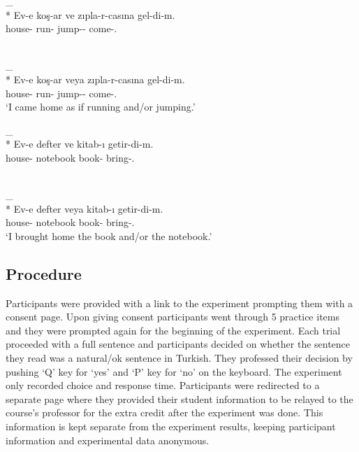 \begin{exe}
    \ex \label{acceptabilityexe}
    \begin{xlist}
    \ex {\Der}\_{\And} \\* 
    \gll Ev-e koş-ar ve zıpla-r-casına gel-di-m. \\ 
    house-{\Dat} run-{\Aor} {\And} jump-{\Aor}-{\Der} come-{\Pst}.{\Fsg} \\
    \glt ${}$
    
    \ex {\Der}\_{\Or} \\*
    \gll Ev-e koş-ar veya zıpla-r-casına gel-di-m. \\ 
    house-{\Dat} run-{\Aor} {\Or} jump-{\Aor}-{\Der} come-{\Pst}.{\Fsg} \\
    \glt `I came home as if running and/or jumping.' 
 
    \ex {\Infl}\_{\And} \\*
    \gll Ev-e defter ve kitab-ı getir-di-m. \\ 
    house-{\Dat} notebook {\And} book-{\Acc} bring-{\Pst}.{\Fsg} \\
    \glt ${}$
    
    \ex {\Infl}\_{\Or} \\*
    \gll Ev-e defter veya kitab-ı getir-di-m. \\ 
    house-{\Dat} notebook {\Or} book-{\Acc} bring-{\Pst}.{\Fsg} \\
    \glt `I brought home the book and/or the notebook.' 
    \end{xlist}
\end{exe}


\subsection{Procedure}

Participants were provided with a link to the experiment prompting them with a consent page. Upon giving consent participants went through 5 practice items and they were prompted again for the beginning of the experiment. Each trial proceeded with a full sentence and participants decided on whether the sentence they read was a natural/ok sentence in Turkish. They professed their decision by pushing `Q' key for `yes' and `P' key for `no' on the keyboard. The experiment only recorded choice and response time. Participants were redirected to a separate page where they provided their student information to be relayed to the course's professor for the extra credit after the experiment was done. This information is kept separate from the experiment results, keeping participant information and experimental data anonymous.

